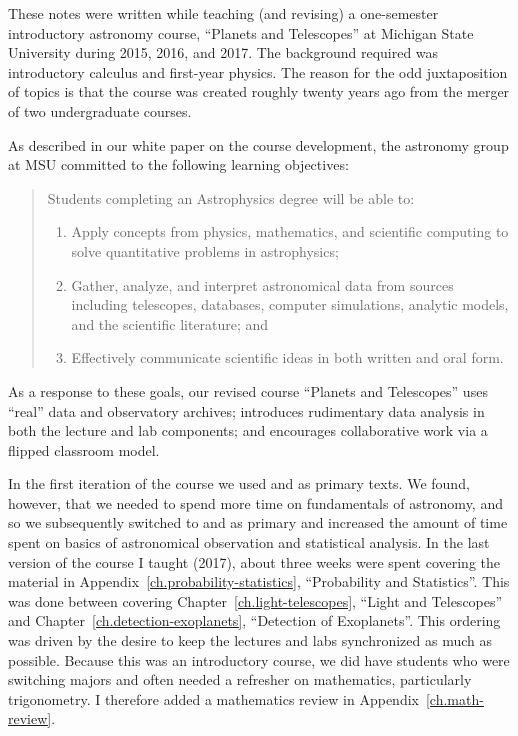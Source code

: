 
These notes were written while teaching (and revising) a one-semester introductory astronomy course, ``Planets and Telescopes'' at Michigan State University during 2015, 2016, and 2017. The background required was  introductory calculus and first-year physics. The reason for the odd juxtaposition of topics is that the course was created roughly twenty years ago from the merger of two undergraduate courses.

As described in our white paper on the course development\cite{BrownDevelopment-of-}, the astronomy group at MSU committed to the following learning objectives:
\begin{quote}
Students completing an Astrophysics degree will be able to:
\begin{enumerate}
\item
Apply concepts from physics, mathematics, and scientific computing to solve quantitative problems in astrophysics;
\item
Gather, analyze, and interpret astronomical data from sources including telescopes, databases, computer simulations, analytic models, and the scientific literature; and
\item
Effectively communicate scientific ideas in both written and oral form.
\end{enumerate}
\end{quote}
As a response to these goals, our revised course ``Planets and Telescopes'' uses ``real'' data and observatory archives; introduces rudimentary data analysis in both the lecture and lab components; and encourages collaborative work via a flipped classroom model.

In the first iteration of the course we used  and  as primary texts. We found, however, that we needed to spend more time on fundamentals of astronomy, and so we subsequently switched to  and  as primary and increased the amount of time spent on basics of astronomical observation and statistical analysis. In the last version of the course I taught (2017), about three weeks were spent covering the material in Appendix~\ref{ch.probability-statistics}, ``Probability and Statistics''. This was done between covering Chapter~\ref{ch.light-telescopes}, ``Light and Telescopes'' and Chapter~\ref{ch.detection-exoplanets}, ``Detection of Exoplanets''.  This ordering was driven by the desire to keep the lectures and labs synchronized as much as possible. Because this was an introductory course, we did have students who were switching majors and often needed a refresher on mathematics, particularly trigonometry. I therefore added a mathematics review in Appendix~\ref{ch.math-review}.

